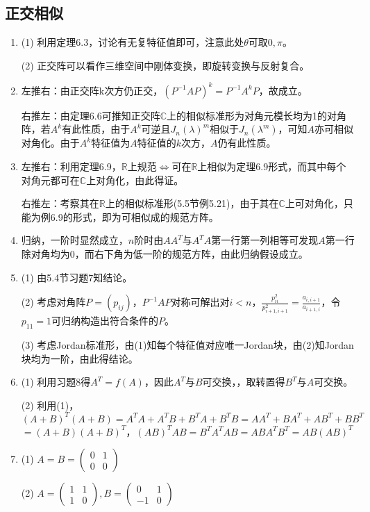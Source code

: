 \documentclass[a4paper,UTF8,fontset=windows]{ctexart}
\begin{document}
\subsection{正交相似}
\begin{enumerate}
\item
(1) 利用定理6.3，讨论有无复特征值即可，注意此处$\theta$可取$0,\pi$。

(2) 正交阵可以看作三维空间中刚体变换，即旋转变换与反射复合。

\item
左推右：由正交阵k次方仍正交，$(P^{-1}AP)^k=P^{-1}A^kP$，故成立。

右推左：由定理6.6可推知正交阵$\mathbb{C}$上的相似标准形为对角元模长均为1的对角阵，若$A^k$有此性质，由于$A^k$可逆且$J_n(\lambda)^m$相似于$J_n(\lambda^m)$，可知$A$亦可相似对角化。由于$A^k$特征值为$A$特征值的$k$次方，$A$仍有此性质。

\item
左推右：利用定理6.9，$\mathbb{R}$上规范$\Leftrightarrow$可在$\mathbb{R}$上相似为定理6.9形式，而其中每个对角元都可在$\mathbb{C}$上对角化，由此得证。

右推左：考察其在$\mathbb{R}$上的相似标准形(5.5节例5.21)，由于其在$\mathbb{C}$上可对角化，只能为例6.9的形式，即为可相似成的规范方阵。

\item
归纳，一阶时显然成立，$n$阶时由$AA^T$与$A^TA$第一行第一列相等可发现$A$第一行除对角均为0，而右下角为低一阶的规范方阵，由此归纳假设成立。

\item
(1) 由5.4节习题7知结论。

(2) 考虑对角阵$P=(p_{ij})$，$P^{-1}AP$对称可解出对$i<n$，$\frac{p_{ii}^2}{p_{i+1,i+1}^2}=\frac{a_{i,i+1}}{a_{i+1,i}}$，令$p_{11}=1$可归纳构造出符合条件的$P$。

(3) 考虑Jordan标准形，由(1)知每个特征值对应唯一Jordan块，由(2)知Jordan块均为一阶，由此得结论。

\item
(1) 利用习题8得$A^T=f(A)$，因此$A^T$与$B$可交换，，取转置得$B^T$与$A$可交换。

(2) 利用(1)，$(A+B)^T(A+B)=A^TA+A^TB+B^TA+B^TB=AA^T+BA^T+AB^T+BB^T$
$=(A+B)(A+B)^T$，$(AB)^TAB=B^TA^TAB=ABA^TB^T=AB(AB)^T$

\item
(1) $A=B=\begin{pmatrix}0&1\\0&0\end{pmatrix}$

(2) $A=\begin{pmatrix}1&1\\1&0\end{pmatrix},B=\begin{pmatrix}0&1\\-1&0\end{pmatrix}$


\end{enumerate}
\end{document}
